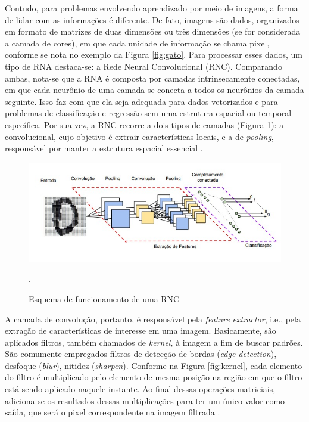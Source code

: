 Contudo, para problemas envolvendo aprendizado por meio de imagens, a forma de lidar com as informações é diferente. De fato, imagens são dados, organizados em formato de matrizes de duas dimensões ou três dimensões (se for considerada a camada de cores), em que cada unidade de informação se chama pixel, conforme se nota no exemplo da Figura \ref{fig:gato}. Para processar esses dados, um tipo de RNA destaca-se: a Rede Neural Convolucional (RNC). Comparando ambas, nota-se que a RNA é composta por camadas intrinsecamente conectadas, em que cada neurônio de uma camada se conecta a todos os neurônios da camada seguinte. Isso faz com que ela seja adequada para dados vetorizados e para problemas de classificação e regressão sem uma estrutura espacial ou temporal específica. Por sua vez, a RNC recorre a dois tipos de camadas (Figura \ref{fig:rnc}): a convolucional, cujo objetivo é extrair características locais, e a de \textit{pooling}, responsável por manter a estrutura espacial essencial \cite{vargas2016estudo}. 

\begin{figure}[!h]
    \centering
    \begin{minipage}{0.9\linewidth}
    \centering
    \captionsetup{justification=centering,margin=0.5cm,font=small}
    \includegraphics[width=0.7\linewidth]{img/cap2/cnn.jpeg}
    \caption{Esquema de funcionamento de uma RNC \cite{vargas2016estudo}}.
    \label{fig:rnc}
    \end{minipage}
\end{figure}

A camada de convolução, portanto, é responsável pela \textit{feature extractor}, i.e., pela extração de características de interesse em uma imagem. Basicamente, são aplicados filtros, também chamados de \textit{kernel}, à imagem a fim de buscar padrões. São comumente empregados filtros de detecção de bordas (\textit{edge detection}), desfoque (\textit{blur}), nitidez (\textit{sharpen}). Conforme na Figura \ref{fig:kernel}, cada elemento do filtro é multiplicado pelo elemento de mesma posição na região em que o filtro está sendo aplicado naquele instante. Ao final dessas operações matriciais, adiciona-se os resultados dessas multiplicações para ter um único valor como saída, que será o pixel correspondente na imagem filtrada \cite{rodrigues2023visao} . 


